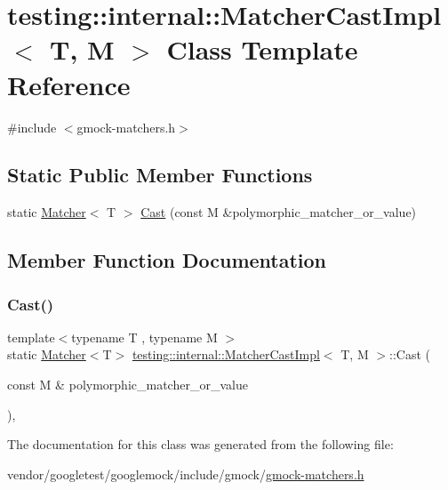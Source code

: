 \hypertarget{classtesting_1_1internal_1_1_matcher_cast_impl}{}\section{testing\+:\+:internal\+:\+:Matcher\+Cast\+Impl$<$ T, M $>$ Class Template Reference}
\label{classtesting_1_1internal_1_1_matcher_cast_impl}


{\ttfamily \#include $<$gmock-\/matchers.\+h$>$}

\subsection*{Static Public Member Functions}
\begin{DoxyCompactItemize}
\item 
static \hyperlink{classtesting_1_1_matcher}{Matcher}$<$ T $>$ \hyperlink{classtesting_1_1internal_1_1_matcher_cast_impl_a488bb69a7845f9198bbb198d8dbe41a8}{Cast} (const M \&polymorphic\+\_\+matcher\+\_\+or\+\_\+value)
\end{DoxyCompactItemize}


\subsection{Member Function Documentation}
\mbox{\label{classtesting_1_1internal_1_1_matcher_cast_impl_a488bb69a7845f9198bbb198d8dbe41a8}} 
\subsubsection{\texorpdfstring{Cast()}{Cast()}}
{\footnotesize\ttfamily template$<$typename T , typename M $>$ \\
static \hyperlink{classtesting_1_1_matcher}{Matcher}$<$T$>$ \hyperlink{classtesting_1_1internal_1_1_matcher_cast_impl}{testing\+::internal\+::\+Matcher\+Cast\+Impl}$<$ T, M $>$\+::Cast (\begin{DoxyParamCaption}\item[{const M \&}]{polymorphic\+\_\+matcher\+\_\+or\+\_\+value }\end{DoxyParamCaption})\hspace{0.3cm}{\ttfamily [inline]}, {\ttfamily [static]}}



The documentation for this class was generated from the following file\+:\begin{DoxyCompactItemize}
\item 
vendor/googletest/googlemock/include/gmock/\hyperlink{gmock-matchers_8h}{gmock-\/matchers.\+h}\end{DoxyCompactItemize}
